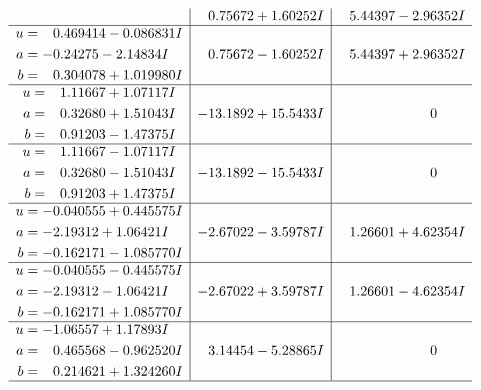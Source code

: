 \documentclass[1p]{elsarticle_modified}
\theoremstyle{definition}
\begin{document}
$$\begin{array}{c|c|c}
 & \phantom{-}0.75672 + 1.60252 I & \phantom{-}5.44397 - 2.96352 I \\ \hline\begin{aligned}
u &= \phantom{-}0.469414 - 0.086831 I \\
a &= -0.24275 - 2.14834 I \\
b &= \phantom{-}0.304078 + 1.019980 I\end{aligned}
 & \phantom{-}0.75672 - 1.60252 I & \phantom{-}5.44397 + 2.96352 I \\ \hline\begin{aligned}
u &= \phantom{-}1.11667 + 1.07117 I \\
a &= \phantom{-}0.32680 + 1.51043 I \\
b &= \phantom{-}0.91203 - 1.47375 I\end{aligned}
 & -13.1892 + 15.5433 I & \phantom{-0.000000 } 0 \\ \hline\begin{aligned}
u &= \phantom{-}1.11667 - 1.07117 I \\
a &= \phantom{-}0.32680 - 1.51043 I \\
b &= \phantom{-}0.91203 + 1.47375 I\end{aligned}
 & -13.1892 - 15.5433 I & \phantom{-0.000000 } 0 \\ \hline\begin{aligned}
u &= -0.040555 + 0.445575 I \\
a &= -2.19312 + 1.06421 I \\
b &= -0.162171 - 1.085770 I\end{aligned}
 & -2.67022 - 3.59787 I & \phantom{-}1.26601 + 4.62354 I \\ \hline\begin{aligned}
u &= -0.040555 - 0.445575 I \\
a &= -2.19312 - 1.06421 I \\
b &= -0.162171 + 1.085770 I\end{aligned}
 & -2.67022 + 3.59787 I & \phantom{-}1.26601 - 4.62354 I \\ \hline\begin{aligned}
u &= -1.06557 + 1.17893 I \\
a &= \phantom{-}0.465568 - 0.962520 I \\
b &= \phantom{-}0.214621 + 1.324260 I\end{aligned}
 & \phantom{-}3.14454 - 5.28865 I & \phantom{-0.000000 } 0\\
 \hline 
 \end{array}$$\newpage$$\begin{array}{c|c|c}  

\end{array}$$
\end{document}
